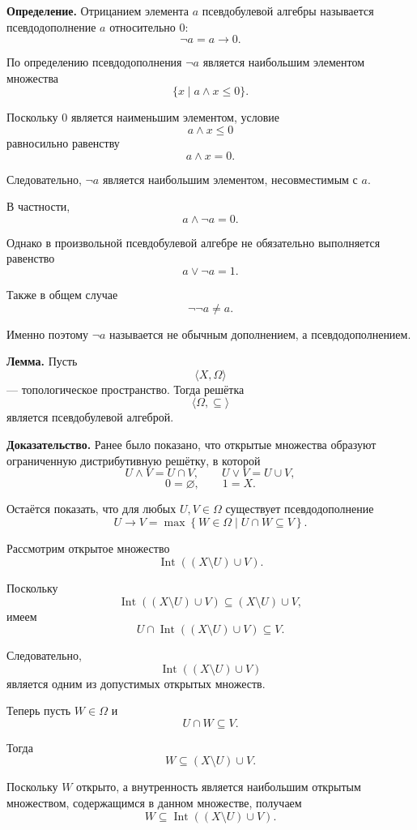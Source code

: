 \documentclass[12pt,a4paper,oneside,openany]{book}
\theoremstyle{definition}
\theoremstyle{plain}
\theoremstyle{remark}
\begin{document}
\textbf{Определение.}
Отрицанием элемента \(a\) псевдобулевой алгебры называется
псевдодополнение \(a\) относительно \(0\):
\[
\neg a=a\to0.
\]

По определению псевдодополнения \(\neg a\) является наибольшим
элементом множества
\[
\{x\mid a\wedge x\leq0\}.
\]

Поскольку \(0\) является наименьшим элементом, условие
\[
a\wedge x\leq0
\]
равносильно равенству
\[
a\wedge x=0.
\]

Следовательно, \(\neg a\) является наибольшим элементом, несовместимым
с \(a\).

В частности,
\[
a\wedge\neg a=0.
\]

Однако в произвольной псевдобулевой алгебре не обязательно выполняется
равенство
\[
a\vee\neg a=1.
\]

Также в общем случае
\[
\neg\neg a\neq a.
\]

Именно поэтому \(\neg a\) называется не обычным дополнением, а
псевдодополнением.


\textbf{Лемма.}
Пусть
\[
\langle X,\Omega\rangle
\]
--- топологическое пространство. Тогда решётка
\[
\langle\Omega,\subseteq\rangle
\]
является псевдобулевой алгеброй.

\textbf{Доказательство.}
Ранее было показано, что открытые множества образуют ограниченную
дистрибутивную решётку, в которой
\[
U\wedge V=U\cap V,
\qquad
U\vee V=U\cup V,
\]
\[
0=\varnothing,
\qquad
1=X.
\]

Остаётся показать, что для любых \(U,V\in\Omega\) существует
псевдодополнение
\[
U\to V
=
\max
\left\{
W\in\Omega
\mathrel{}\middle|\mathrel{}
U\cap W\subseteq V
\right\}.
\]

Рассмотрим открытое множество
\[
\operatorname{Int}
\left(
(X\setminus U)\cup V
\right).
\]

Поскольку
\[
\operatorname{Int}
\left(
(X\setminus U)\cup V
\right)
\subseteq
(X\setminus U)\cup V,
\]
имеем
\[
U\cap
\operatorname{Int}
\left(
(X\setminus U)\cup V
\right)
\subseteq V.
\]

Следовательно,
\[
\operatorname{Int}
\left(
(X\setminus U)\cup V
\right)
\]
является одним из допустимых открытых множеств.

Теперь пусть \(W\in\Omega\) и
\[
U\cap W\subseteq V.
\]

Тогда
\[
W\subseteq(X\setminus U)\cup V.
\]

Поскольку \(W\) открыто, а внутренность является наибольшим открытым
множеством, содержащимся в данном множестве, получаем
\[
W
\subseteq
\operatorname{Int}
\left(
(X\setminus U)\cup V
\right).
\]
\end{document}
